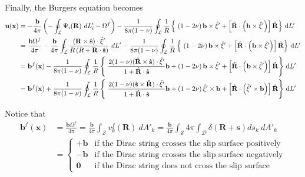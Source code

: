 \documentclass[10pt]{report}
\begin{document}
{Finally, the Burgers equation becomes
\begin{align}
 \mathbf{u}(\mathbf x)
 &=-\frac{\mathbf{ b}}{4\pi}\left(-\oint_\mathcal{L}\Psi_i(\mathbf{R})\ dL'_i-\Omega^f\right)-\frac{1}{8\pi(1-\nu)}\oint_\mathcal{L}\frac{1}{R}\left\{\ 
 \left(1-2\nu\right) \mathbf{ b}\times\hat{\mathbf{ \xi}}'
+ \left[\hat{\mathbf{ R}}\cdot\left(\mathbf{ b}\times\hat{\mathbf{ \xi}}' \right) \right]\hat{\mathbf{ R}}  \right\}\dL'\nonumber\\
&=\frac{\mathbf{ b}\Omega^f}{4\pi}
-\frac{\mathbf{ b}}{4\pi}\oint_\mathcal{L}\frac{(\mathbf{R}\times\hat{\mathbf{s}})\cdot\hat{\mathbf{\xi}}'}{R\left(R+\mathbf{R}\cdot\hat{\mathbf{s}}\right)}\ dL'
-\frac{1}{8\pi(1-\nu)}\oint_\mathcal{L}\frac{1}{R}\left\{\ 
 \left(1-2\nu\right) \mathbf{ b}\times\hat{\mathbf{ \xi}}'
+ \left[\hat{\mathbf{ R}}\cdot\left(\mathbf{ b}\times\hat{\mathbf{ \xi}}' \right) \right]\hat{\mathbf{ R}}  \right\}\dL'\nonumber\\
&=\mathbf{b}^f(\mathbf x)
-\frac{1}{8\pi(1-\nu)}\oint_\mathcal{L}   
\frac{1}{R}\left\{\ \frac{2(1-\nu)(\hat{\mathbf{R}}\times\hat{\mathbf{s}})\cdot\hat{\mathbf{\xi}}'}{1+\hat{\mathbf{R}}\cdot\hat{\mathbf{s}}}\mathbf{ b}
+ \left(1-2\nu\right) \mathbf{ b}\times\hat{\mathbf{ \xi}}'
+ \left[\hat{\mathbf{ R}}\cdot\left(\mathbf{ b}\times\hat{\mathbf{ \xi}}' \right) \right]\hat{\mathbf{ R}}  \right\}\dL'\nonumber\\
&=\mathbf{b}^f(\mathbf x)
+\frac{1}{8\pi(1-\nu)}\oint_\mathcal{L}   
\frac{1}{R}\left\{\ \frac{2(1-\nu)(\hat{\mathbf{s}}\times\hat{\mathbf{R}})\cdot\hat{\mathbf{\xi}}'}{1+\hat{\mathbf{R}}\cdot\hat{\mathbf{s}}}\mathbf{ b}
+ \left(1-2\nu\right) \hat{\mathbf{ \xi}}'\times \mathbf{ b}
+ \left[\hat{\mathbf{ R}}\cdot\left(\hat{\mathbf{ \xi}}'\times\mathbf{ b} \right) \right]\hat{\mathbf{ R}}  \right\}\dL'\nonumber\\
\end{align}

Notice that
\begin{align}
\mathbf{b}^f(\mathbf x)
&=\frac{\mathbf{ b}\Omega^f}{4\pi}
=\frac{\mathbf{ b}}{4\pi}\int_\mathcal{S} v^f_k(\mathbf{R})\ dA'_k
=\frac{\mathbf{ b}}{4\pi}\int_\mathcal{S} 4\pi\int_\mathcal{D}\delta(\mathbf{R}+\mathbf{s})ds_k\ dA'_k\nonumber\\
&=\begin{cases}
+\mathbf{b}&\mbox{if the Dirac string crosses the slip surface positively}\\
-\mathbf{b}&\mbox{if the Dirac string crosses the slip surface negatively}\\
\mathbf{0}&\mbox{if the Dirac string does not cross the slip surface }
\end{cases}
\end{align}

}
\end{document}

